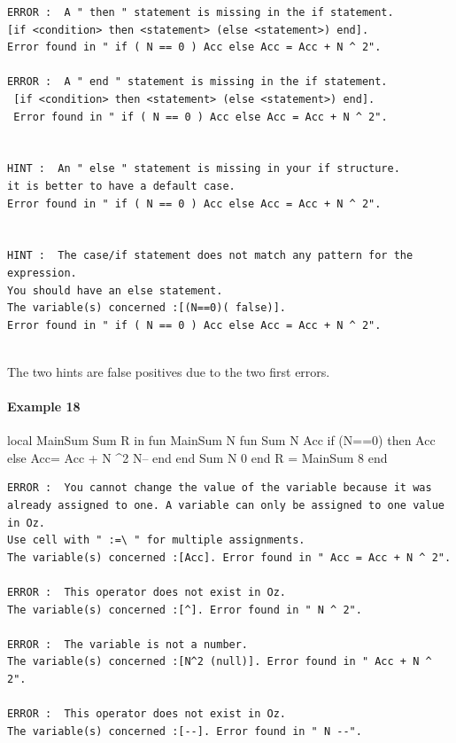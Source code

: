 \documentclass[11pt,a4paper,twoside,openright]{report}
\begin{document}
\begin{lstlisting}
ERROR :  A " then " statement is missing in the if statement. 
[if <condition> then <statement> (else <statement>) end]. 
Error found in " if ( N == 0 ) Acc else Acc = Acc + N ^ 2".

ERROR :  A " end " statement is missing in the if statement.
 [if <condition> then <statement> (else <statement>) end]. 
 Error found in " if ( N == 0 ) Acc else Acc = Acc + N ^ 2".


HINT :  An " else " statement is missing in your if structure. 
it is better to have a default case. 
Error found in " if ( N == 0 ) Acc else Acc = Acc + N ^ 2".


HINT :  The case/if statement does not match any pattern for the expression. 
You should have an else statement. 
The variable(s) concerned :[(N==0)( false)]. 
Error found in " if ( N == 0 ) Acc else Acc = Acc + N ^ 2".


\end{lstlisting}

The two hints are false positives due to the two first errors.

\paragraph{Example 18}
\begin{OZ}
local MainSum Sum R in
	fun {MainSum N}
		fun {Sum N Acc}
			if (N==0) then Acc
			else Acc= Acc + N ^2 N--
			end
	    end
    {Sum N 0}
	end
	R = {MainSum 8}
end

\end{OZ}

\begin{lstlisting}
ERROR :  You cannot change the value of the variable because it was 
already assigned to one. A variable can only be assigned to one value in Oz. 
Use cell with " :=\ " for multiple assignments. 
The variable(s) concerned :[Acc]. Error found in " Acc = Acc + N ^ 2".

ERROR :  This operator does not exist in Oz. 
The variable(s) concerned :[^]. Error found in " N ^ 2".

ERROR :  The variable is not a number. 
The variable(s) concerned :[N^2 (null)]. Error found in " Acc + N ^ 2".

ERROR :  This operator does not exist in Oz. 
The variable(s) concerned :[--]. Error found in " N --".

\end{lstlisting}
\end{document}
